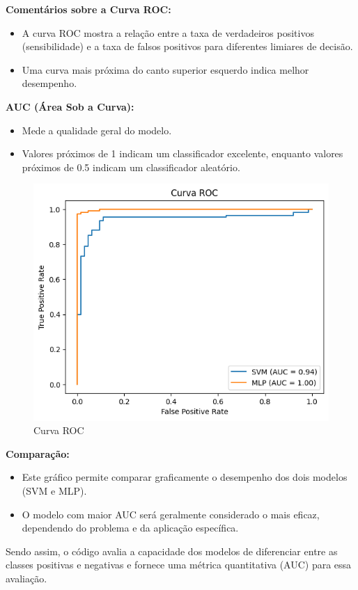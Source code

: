 \documentclass[12pt,a4paper,oneside,openany]{article}
\begin{document}
\noindent \textbf{Comentários sobre a Curva ROC:}
\begin{itemize}
    \item A curva ROC mostra a relação entre a taxa de verdadeiros positivos (sensibilidade) e a taxa de falsos positivos para diferentes limiares de decisão.
    \item Uma curva mais próxima do canto superior esquerdo indica melhor desempenho.
\end{itemize}
\noindent\textbf{AUC (Área Sob a Curva):}
\begin{itemize}
    \item Mede a qualidade geral do modelo.
    \item Valores próximos de 1 indicam um classificador excelente, enquanto valores próximos de 0.5 indicam um classificador aleatório.
\end{itemize}

\begin{figure}[H]
    \centering
    \includegraphics[width=0.8\linewidth]{graficos/curva_roc_sem_otimizacao.png}
    \caption{Curva ROC}
    \label{fig:curva_roc}
\end{figure}

\noindent \textbf{Comparação:}
\begin{itemize}
    \item Este gráfico permite comparar graficamente o desempenho dos dois modelos (SVM e MLP).
    \item O modelo com maior AUC será geralmente considerado o mais eficaz, dependendo do problema e da aplicação específica.
\end{itemize}

\noindent
Sendo assim, o código avalia a capacidade dos modelos de diferenciar entre as classes positivas e negativas e fornece uma métrica quantitativa (AUC) para essa avaliação.
\end{document}
